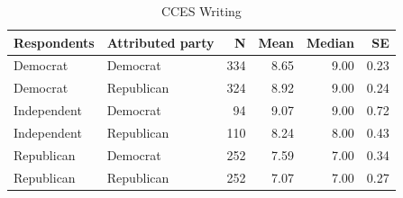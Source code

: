 \begin{table}[ht]
\centering
\caption{CCES Writing}
\label{tab:error_sum_cces}
\begin{tabular}{llrrrr}
  \toprule
Respondents & Attributed party & N & Mean & Median & SE \\
  \midrule
Democrat & Democrat & 334 & 8.65 & 9.00 & 0.23 \\
  Democrat & Republican & 324 & 8.92 & 9.00 & 0.24 \\
  Independent & Democrat &  94 & 9.07 & 9.00 & 0.72 \\
  Independent & Republican & 110 & 8.24 & 8.00 & 0.43 \\
  Republican & Democrat & 252 & 7.59 & 7.00 & 0.34 \\
  Republican & Republican & 252 & 7.07 & 7.00 & 0.27 \\
   \bottomrule
\end{tabular}
\end{table}
